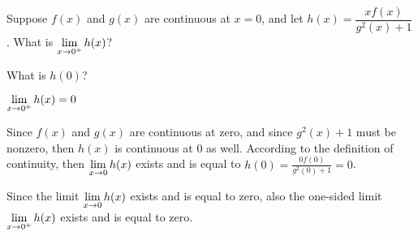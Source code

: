 \begin{question}
Suppose $f(x)$ and $g(x)$ are continuous at $x=0$, and let $h(x)=\dfrac{xf(x)}{g^2(x)+1}$. What is $\displaystyle\lim_{x \to 0^+} h(x)$?
\end{question}
\begin{hint}
What is $h(0)$?
\end{hint}
\begin{answer}
$\displaystyle\lim_{x \to 0^+} h(x)=0$
\end{answer}
\begin{solution}
Since $f(x)$ and $g(x)$ are continuous at zero, and since $g^2(x)+1$ must be nonzero, then $h(x)$ is continuous at 0 as well. According to the definition of continuity, then $\displaystyle\lim_{x \to 0}h(x)$ exists and is equal to $h(0)=\frac{0f(0)}{g^2(0)+1}=0$.

Since the limit $\displaystyle\lim_{x \to 0}h(x)$ exists and is equal to zero, also the one-sided limit
$\displaystyle\lim_{x \to 0^+}h(x)$ exists and is equal to zero.
\end{solution}


\subsection*{\Procedural}

